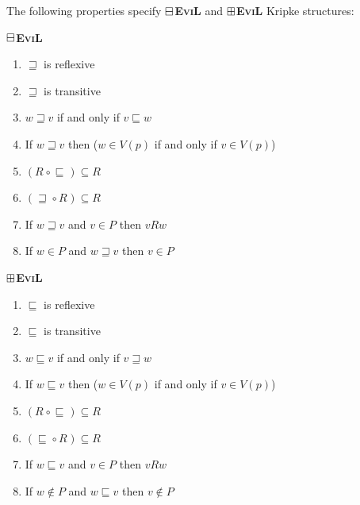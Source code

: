 \begin{definition}The following properties specify 
\textbf{$\boxminus$\textsc{EviL}} and \textbf{$\boxplus$\textsc{EviL}} Kripke structures:

\begin{minipage}[b]{0.5\linewidth}
\begin{center}
\textbf{$\boxminus$\textsc{EviL}}
\end{center}
  \begin{enumerate}[label=\textup{(\emph{\Roman*})$^\BM$}, topsep=0.0in, parsep=0.075in]
    \item \label{MpI} $\sqsupseteq$ is reflexive
    \item \label{Mptrans} $\sqsupseteq$ is transitive 
    \item \label{Mpreverse} $w \sqsupseteq v$ if and only if $v
    \sqsubseteq w$
   \item \label{Mislandiff} If $w \sqsupseteq v$ then ($w \in V (p)$ if and only if $v \in V (p)$)
     \item \label{MpV} $(R^{} \circ \sqsubseteq^{}) \subseteq
    R^{} $
     \item \label{MpVI} $(\sqsupseteq^{} \circ R^{}) \subseteq
R^{}$
     \item\label{MpVII} 
If $w \sqsupseteq v$ and $v \in P$ then $v R w$

    \item\label{MpIX} If $w \in P$ and $w \sqsupseteq v$ then $v
     \in P$
  \end{enumerate}
\end{minipage}
\hspace{0.5cm}
\begin{minipage}[b]{0.5\linewidth}
\begin{center}
\textbf{$\boxplus$\textsc{EviL}}
\end{center}
  \begin{enumerate}[label=\textup{(\emph{\Roman*})$^\BP$}, topsep=0.0in, parsep=0.075in]
    \item \label{PpI} $\sqsubseteq$ is reflexive
    \item \label{Pptrans} $\sqsubseteq$ is transitive 
    \item \label{Ppreverse} $w \sqsubseteq v$ if and only if $v \sqsupseteq w$
   \item \label{Pislandiff} If $w \sqsubseteq v$ then ($w \in V (p)$ if and only if $v \in V (p)$)
     \item \label{PpV}  $(R^{} \circ \sqsubseteq^{}) \subseteq
    R^{} $
     \item \label{PpVI} $(\sqsubseteq^{} \circ R^{}) \subseteq
 R^{}$
     \item\label{PpVII} If $w \sqsubseteq v$ and $v \in P$ then $v
       R w$

    \item\label{PpIX} If $w \nin P$ and $w \sqsubseteq v$ then $v
     \nin P$
  \end{enumerate}
\end{minipage}
\end{definition}


